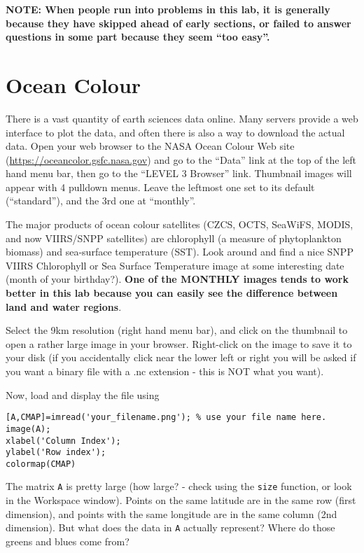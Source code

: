 \documentclass[letterpaper,10pt]{article}
\begin{document}
{\bf NOTE: When people run into problems in this lab, it is generally because they have skipped ahead of
early sections, or failed to answer questions in some part because 
they seem ``too easy''.}

\newpage
\section{Ocean Colour}

There is a vast quantity of earth sciences data online. Many servers
provide a web interface to plot the data, and often there is also a way
to download the actual data. Open your web browser to the NASA Ocean Colour Web site 
(\url{https://oceancolor.gsfc.nasa.gov})
and go to the ``Data'' link at the top of the left hand menu bar, then go to the ``LEVEL 3 Browser'' link.  Thumbnail images will appear with 4 pulldown menus.  Leave the leftmost one set to its default (``standard''),
and the 3rd one at ``monthly''.

The major products of  ocean colour satellites (CZCS, OCTS, SeaWiFS, MODIS, and now VIIRS/SNPP satellites) are 
chlorophyll (a measure of phytoplankton biomass) and sea-surface temperature (SST). Look around and find a nice SNPP VIIRS Chlorophyll or
Sea Surface Temperature image at some interesting date (month of your birthday?). {\bf One of the MONTHLY images
tends to work better in this lab because you can easily see the difference
between land and water regions}.

Select the 9km resolution (right hand menu bar), and click on the thumbnail
to open a rather large image in your browser. Right-click on
the image to save it to your disk (if you accidentally click near the lower left or right you will be asked if you want 
a binary file with a .nc extension - this is NOT what you want).

Now, load and display the file using
\begin{verbatim}
[A,CMAP]=imread('your_filename.png'); % use your file name here.
image(A);
xlabel('Column Index');
ylabel('Row index');
colormap(CMAP)
\end{verbatim}

The matrix \verb+A+ is pretty large (how large? - check using the \verb+size+ function, or look in the
Workspace window).
Points on the same latitude are in the same row (first dimension), and 
points with the same longitude are in the same column (2nd dimension). 
But what does the data in \verb+A+ actually represent? Where do those greens and blues come from?
\end{document}
